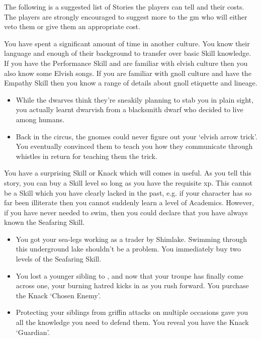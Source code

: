 \begin{multicols}{2}

\noindent
The following is a suggested list of Stories the players can tell and their costs.
The players are strongly encouraged to suggest more to the \gls{gm} who will either veto them or give them an appropriate cost.

You have spent a significant amount of time in another culture. You know their language and enough of their background to transfer over basic Skill knowledge. If you have the Performance Skill and are familiar with elvish culture then you also know some Elvish songs.
If you are familiar with gnoll culture and have the Empathy Skill then you know a range of details about gnoll etiquette and lineage.

\begin{itemize}
\item While the dwarves think they're sneakily planning to stab you in plain sight, you actually learnt dwarvish from a blacksmith dwarf who decided to live among humans.
\item Back in the circus, the gnomes could never figure out your `elvish arrow trick'.
You eventually convinced them to teach you how they communicate through whistles in return for teaching them the trick.
\end{itemize}

\label{surpriseSkill}
You have a surprising Skill or Knack which will comes in useful.
As you tell this story, you can buy a Skill level so long as you have the requisite \gls{xp}.
This cannot be a Skill which you have clearly lacked in the past, e.g. if your character has so far been illiterate then you cannot suddenly learn a level of Academics.
However, if you have never needed to swim, then you could declare that you have always known the Seafaring Skill.

\begin{itemize}
  \item
  You got your sea-legs working as a trader by Shimlake.
  Swimming through this underground lake shouldn't be a problem.
  You immediately buy two levels of the Seafaring Skill.
  \item
  You lost a younger sibling to , and now that your troupe has finally come across one, your burning hatred kicks in as you rush forward.
  You purchase the Knack `Chosen Enemy'.
  \item
  Protecting your siblings from griffin attacks on multiple occasions gave you all the knowledge you need to defend them.
  You reveal you have the Knack `Guardian'.
\end{itemize}


\end{multicols}
